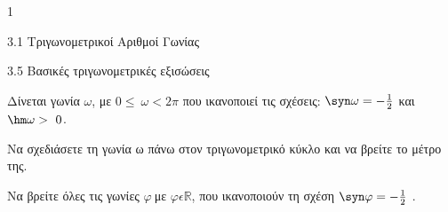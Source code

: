 \begin{ylh}{1}
\item 3.1 Τριγωνομετρικοί Αριθμοί Γωνίας
\item 3.5 Βασικές τριγωνομετρικές εξισώσεις
\end{ylh}
Δίνεται γωνία $\omega$, με $0 \leq \ \omega < 2\pi$ που ικανοποιεί τις σχέσεις: $\syn \omega = - \frac{1}{2}$ και $\hm \omega > \ 0$.
\begin{alist}
\item Να σχεδιάσετε τη γωνία ω πάνω στον τριγωνομετρικό κύκλο και να βρείτε το μέτρο της.
\item Να βρείτε όλες τις γωνίες $\varphi\ $με $\varphi\epsilon\mathbb{R}$, που ικανοποιούν τη σχέση $\syn \varphi = - \frac{1}{2}$ .
\end{alist}

